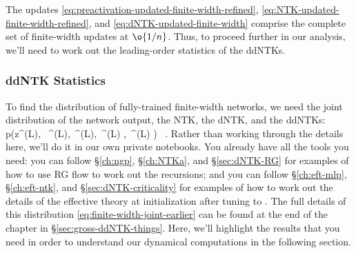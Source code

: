 The updates \eqref{eq:preactivation-updated-finite-width-refined}, \eqref{eq:NTK-updated-finite-width-refined}, and \eqref{eq:dNTK-updated-finite-width} comprise the complete set of finite-width updates at $\o{1/n}$. Thus, to proceed further in our analysis, we'll need to work out the leading-order statistics of the ddNTKs.












\subsubsection{ddNTK Statistics}
To find the distribution of fully-trained finite-width networks, we need the joint distribution of the network output, the NTK, the dNTK, and the ddNTKs:
\be\label{eq:finite-width-joint-earlier}
p\!\le(z^{(L)}, \, \NTK^{(L)},\, \dNTK^{(L)},\, \ddNTK^{(L)} , \,\ddNTKII^{(L)}   \Big\vert \D\ri) \, .
\ee
Rather than working through the details here, we'll do it in our own private notebooks. You already have all the tools you need: you can follow \S\ref{ch:ngp}, \S\ref{ch:NTKa}, and \S\ref{sec:dNTK-RG} for examples of how to use RG flow to work out the recursions; and you can follow \S\ref{ch:eft-mlp}, \S\ref{ch:eft-ntk}, and \S\ref{sec:dNTK-criticality} for examples of how to work out the details of the effective theory at initialization after tuning to . The full details of this distribution \eqref{eq:finite-width-joint-earlier} can be found at the end of the chapter in \S\ref{sec:gross-ddNTK-things}. Here, we'll highlight the results that you need in order to understand our dynamical computations in the following section. 

